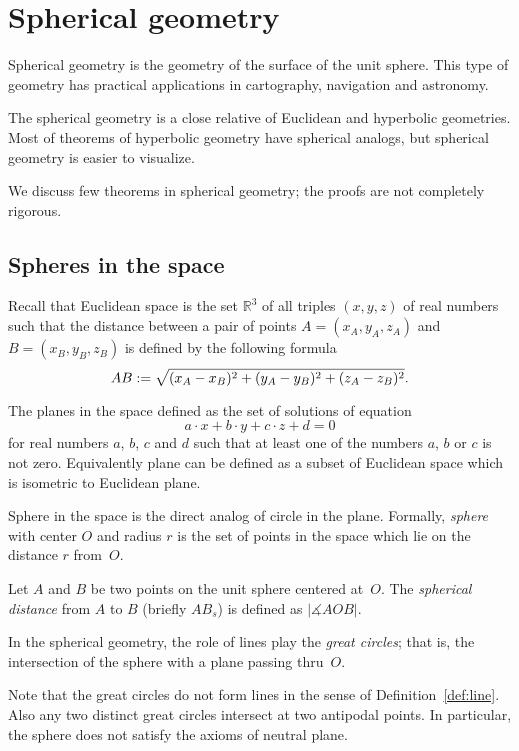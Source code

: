 \chapter{Spherical geometry}
\label{chap:sphere}

Spherical geometry is the geometry 
of the surface of the unit sphere.
This type of geometry has practical  applications in cartography, navigation  and astronomy.

The spherical geometry is a close relative of Euclidean and hyperbolic geometries.
Most of theorems of hyperbolic geometry have spherical analogs,
but spherical geometry is easier to visualize. 

We discuss few theorems in spherical geometry;
the proofs are not completely rigorous.

\section*{Spheres in the space}

Recall that Euclidean space is the set $\mathbb{R}^3$ of all triples $(x,y,z)$ of real numbers
such that the distance between a pair of points
$A=(x_A,y_A,z_A)$ and $B=(x_B,y_B,z_B)$
is defined by the following formula
$$AB
:=
\sqrt{(x_A-x_B)^2+(y_A-y_B)^2+(z_A-z_B)^2}.$$

The planes in the space defined as the set of solutions of equation 
$$a\cdot x+b\cdot y+c\cdot z+d=0$$ 
for real numbers $a$, $b$, $c$ and $d$ such that at least one of the numbers $a$, $b$ or $c$ is not zero.
Equivalently plane can be defined as a subset of Euclidean space which is isometric to Euclidean plane.

Sphere in the space is the direct analog of circle in the plane.
Formally, \emph{sphere} with center $O$ and radius $r$ is the set of points in the space which lie on the distance $r$ from~$O$.

Let $A$ and $B$ be two points on the unit sphere centered at~$O$.
The \emph{spherical distance} from $A$ to $B$
(briefly $AB_s$)
 is defined as  $|\measuredangle AOB|$. 

In the spherical geometry, the role of lines play the \emph{great circles};
that is, the intersection of the sphere with a plane passing thru~$O$.


Note that the great circles do not form lines in the sense of Definition~\ref{def:line}.
Also any two distinct great circles intersect at two antipodal points.
In particular, the sphere does not satisfy the axioms of neutral plane.







